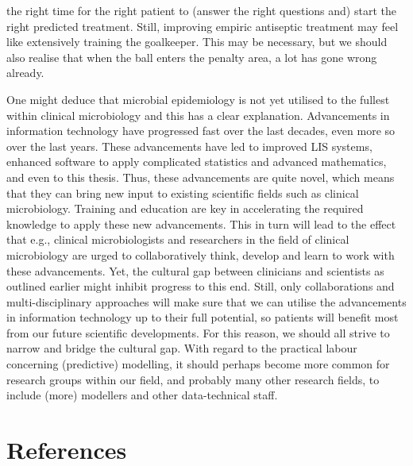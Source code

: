 \documentclass[
]{book}
\begin{document}
the right time for the right patient to (answer the right questions and) start the right predicted treatment. Still, improving empiric antiseptic treatment may feel like extensively training the goalkeeper. This may be necessary, but we should also realise that when the ball enters the penalty area, a lot has gone wrong already.

One might deduce that microbial epidemiology is not yet utilised to the fullest within clinical microbiology and this has a clear explanation. Advancements in information technology have progressed fast over the last decades, even more so over the last years. These advancements have led to improved LIS systems, enhanced software to apply complicated statistics and advanced mathematics, and even to this thesis. Thus, these advancements are quite novel, which means that they can bring new input to existing scientific fields such as clinical microbiology. Training and education are key in accelerating the required knowledge to apply these new advancements. This in turn will lead to the effect that e.g., clinical microbiologists and researchers in the field of clinical microbiology are urged to collaboratively think, develop and learn to work with these advancements. Yet, the cultural gap between clinicians and scientists as outlined earlier might inhibit progress to this end. Still, only collaborations and multi-disciplinary approaches will make sure that we can utilise the advancements in information technology up to their full potential, so patients will benefit most from our future scientific developments. For this reason, we should all strive to narrow and bridge the cultural gap. With regard to the practical labour concerning (predictive) modelling, it should perhaps become more common for research groups within our field, and probably many other research fields, to include (more) modellers and other data-technical staff.

\hypertarget{references-10}{%
\section*{References}\label{references-10}}
\end{document}
